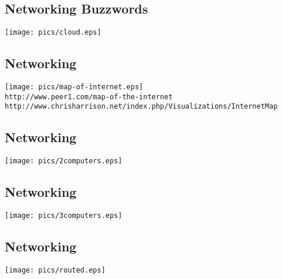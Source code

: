 \documentclass[xga]{xdvislides}
\begin{document}
\subsection{Networking Buzzwords}
\vspace*{\fill}
\begin{center}
	\texttt{[image: pics/cloud.eps]}
\end{center}
\vspace*{\fill}

\subsection{Networking}
\vspace*{\fill}
\begin{center}
	\texttt{[image: pics/map-of-internet.eps]} \\
	\vspace*{\fill}
	\small
	\verb+http://www.peer1.com/map-of-the-internet+ \\
	\verb+http://www.chrisharrison.net/index.php/Visualizations/InternetMap+
	\Normalsize
\end{center}

\subsection{Networking}
\vspace*{\fill}
\begin{center}
	\texttt{[image: pics/2computers.eps]} \\
\end{center}
\vspace*{\fill}

\subsection{Networking}
\vspace*{\fill}
\begin{center}
	\texttt{[image: pics/3computers.eps]} \\
\end{center}
\vspace*{\fill}

\subsection{Networking}
\vspace*{\fill}
\begin{center}
	\texttt{[image: pics/routed.eps]} \\
\end{center}
\vspace*{\fill}
\end{document}
